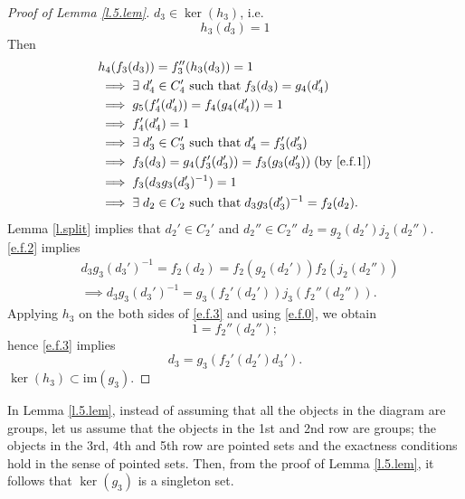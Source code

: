 \documentclass[11pt,twoside]{article}
\begin{document}
\begin{proof}[Proof of Lemma \ref{l.5.lem}]
\sps \(d_3\in\ker(h_3)\), i.e.
\begin{equation}\label{e.f.0}
h_3(d_3)=1
\end{equation}
Then
\begin{align}
& h_4(f_3(d_3)) = f_3''(h_3(d_3))=1\\
& \implies \exists\; d_4'\in C_4' \text{ such that\;}f_3(d_3)=g_4(d_4') \label{e.f.1}\\
& \implies g_5(f_4'(d_4'))=f_4(g_4(d_4'))=1\\
& \implies f_4'(d_4') = 1\\
& \implies \exists\; d_3' \in C_3'\text{ such that\;} d_4'=f_3'(d_3')\\
& \implies f_3(d_3)= g_4(f_3'(d_3'))= f_3(g_3(d_3'))\;(\text{by } \eqref{e.f.1})\\
& \implies f_3(d_3g_3(d_3')^{-1})=1\\
& \implies \exists\; d_2\in C_2\text{ such that\;}d_3g_3(d_3')^{-1}=f_2(d_2) \label{e.f.2}.
\end{align}
Lemma \ref{l.split} implies that \te \(d_2'\in C_2'\) and \(d_2''\in C_2''\) \st \(d_2=g_2(d_2')j_2(d_2'')\). \hn \eqref{e.f.2} implies
\begin{align}
& d_3g_3(d_3')^{-1}=f_2(d_2) = f_2(g_2(d_2'))f_2(j_2(d_2''))\\
& \implies d_3g_3(d_3')^{-1}=g_3(f_2'(d_2'))j_3(f_2''(d_2'')) \label{e.f.3}.
\end{align}
Applying \(h_3\) on the both sides of \eqref{e.f.3} and using \eqref{e.f.0}, we obtain
\[1=f_2''(d_2'');\]
hence \eqref{e.f.3} implies 
\[d_3=g_3(f_2'(d_2')d_3').\]
\tf \(\ker(h_3)\subset \text{im}(g_3)\).
\end{proof}

\begin{rmk}\label{r.5.lem}
In Lemma \ref{l.5.lem}, instead of assuming that all the objects in the diagram are groups, let us assume that the objects in the 1st and 2nd row are groups; the objects in the 3rd, 4th and 5th row are pointed sets and the exactness conditions hold in the sense of pointed sets. Then, from the proof of Lemma \ref{l.5.lem}, it follows that \(\ker(g_3)\) is a singleton set.
\end{rmk}
\end{document}
